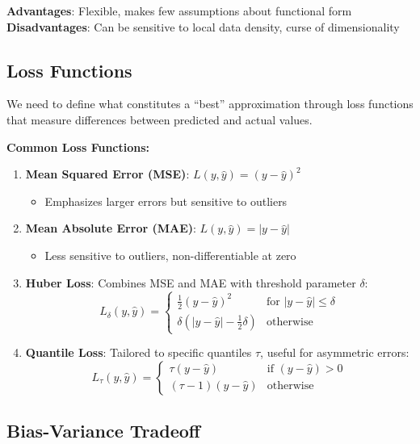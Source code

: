 \documentclass[
  letterpaper,
  DIV=11,
  numbers=noendperiod]{scrreprt}
\providecommand{\tightlist}{%
  \setlength{\itemsep}{0pt}\setlength{\parskip}{0pt}}
\begin{document}
\textbf{Advantages}: Flexible, makes few assumptions about functional
form \textbf{Disadvantages}: Can be sensitive to local data density,
curse of dimensionality

\subsection{Loss Functions}\label{loss-functions}

We need to define what constitutes a ``best'' approximation through loss
functions that measure differences between predicted and actual values.

\textbf{Common Loss Functions:}

\begin{enumerate}
\def\labelenumi{\arabic{enumi}.}
\item
  \textbf{Mean Squared Error (MSE)}: \(L(y, \hat{y}) = (y - \hat{y})^2\)

  \begin{itemize}
  \tightlist
  \item
    Emphasizes larger errors but sensitive to outliers
  \end{itemize}
\item
  \textbf{Mean Absolute Error (MAE)}: \(L(y, \hat{y}) = |y - \hat{y}|\)

  \begin{itemize}
  \tightlist
  \item
    Less sensitive to outliers, non-differentiable at zero
  \end{itemize}
\item
  \textbf{Huber Loss}: Combines MSE and MAE with threshold parameter
  \(\delta\): \[
  L_\delta(y, \hat{y}) = \begin{cases} 
  \frac{1}{2}(y - \hat{y})^2 & \text{for } |y - \hat{y}| \leq \delta \\
  \delta \left( |y - \hat{y}| - \frac{1}{2}\delta \right) & \text{otherwise}
  \end{cases}
  \]
\item
  \textbf{Quantile Loss}: Tailored to specific quantiles \(\tau\),
  useful for asymmetric errors: \[
  L_\tau(y, \hat{y}) = \begin{cases}
  \tau(y - \hat{y}) & \text{if } (y - \hat{y}) > 0 \\
  (\tau - 1)(y - \hat{y}) & \text{otherwise}
  \end{cases}
  \]
\end{enumerate}

\subsection{Bias-Variance Tradeoff}\label{bias-variance-tradeoff}
\end{document}
